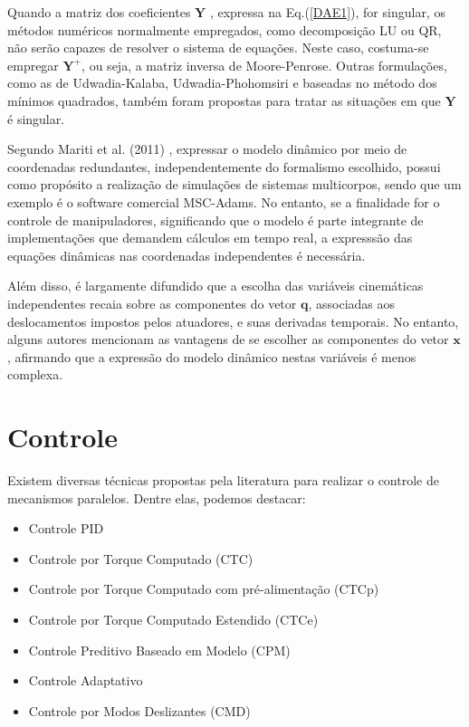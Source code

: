 \documentclass[]{politex}
\begin{document}
Quando a matriz dos coeficientes $\mathbf{Y}$ , expressa na Eq.(\ref{DAE1}), for singular, os métodos numéricos normalmente empregados, como decomposição LU ou QR, não serão capazes de resolver o sistema de equações. Neste caso, costuma-se empregar $\mathbf{Y}^+$, ou seja, a matriz inversa de Moore-Penrose. Outras formulações, como as de Udwadia-Kalaba, Udwadia-Phohomsiri e baseadas no método dos mínimos quadrados, também foram propostas para tratar as situações em que $\mathbf{Y}$ é singular.

Segundo Mariti et al. (2011) \cite{mariti}, expressar o modelo dinâmico por meio de coordenadas redundantes, independentemente do formalismo escolhido, possui como propósito a realização de simulações de sistemas multicorpos, sendo que um exemplo é o software comercial MSC-Adams. No entanto, se a finalidade for o controle de manipuladores, significando que o modelo é parte integrante de implementações que demandem  cálculos em tempo real, a expresssão das equações dinâmicas nas coordenadas independentes é necessária.

Além disso, é largamente difundido que a escolha das variáveis cinemáticas independentes recaia sobre as componentes do vetor $\mathbf{q}$, associadas aos deslocamentos impostos pelos atuadores, e suas derivadas temporais. No entanto, alguns autores \cite{Li, khalil} mencionam as vantagens de se escolher as componentes do vetor $\mathbf{x}$, afirmando que a expressão do modelo dinâmico nestas variáveis é menos complexa.

\section{Controle}

Existem diversas técnicas propostas pela literatura para realizar o controle de mecanismos paralelos. Dentre elas, podemos destacar:

\begin{itemize}
\item Controle PID
\item Controle por Torque Computado (CTC)
\item Controle por Torque Computado com pré-alimentação (CTCp)
\item Controle por Torque Computado Estendido (CTCe)
\item Controle Preditivo Baseado em Modelo (CPM)
\item Controle Adaptativo
\item Controle por Modos Deslizantes (CMD)
\end{itemize}
\end{document}
